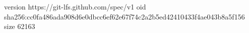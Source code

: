 version https://git-lfs.github.com/spec/v1
oid sha256:cc0fa486ada908d6e0dbcc6ef62e67f74c2a2b5ed42410433f4ae043b8a5f156
size 62163
